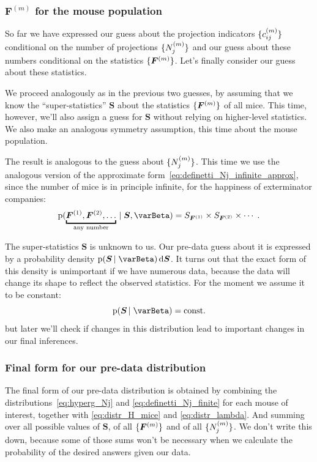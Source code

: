 \documentclass[\ifafour a4paper,12pt,\else a5paper,10pt,\fi%
onecolumn,oneside,article,%
british%
]{memoir}
\theoremstyle{remark}
\theoremstyle{innote}
\newcommand*{\di}{\mathrm{d}}%
\newcommand*{\pf}{\mathrm{p}}%
\renewcommand*{\|}[1][]{\nonscript\,#1\vert\nonscript\;\mathopen{}}
\newcommand*{\yI}{\varBeta}
\newcommand*{\yF}{\bm{F}}
\newcommand*{\yFm}[1][m]{\yF^{(#1)}}
\newcommand*{\yNm}[1][m]{N^{(#1)}}
\newcommand*{\ycm}[1][m]{c^{(#1)}}
\newcommand*{\ySS}{S}
\newcommand*{\yS}{\bm{\ySS}}
\DeclarePairedDelimiter\tu{\{}{\}}
\begin{document}
\subsubsection{$\yFm$ for the mouse population}
\label{sec:allmice_exch}

So far we have expressed our guess about the projection indicators
$\tu{\ycm_{ij}}$ conditional on the number of projections $\tu{\yNm_{j}}$
and our guess about these numbers conditional on the statistics
$\tu{\yFm}$. Let's finally consider our guess about these statistics.

We proceed analogously as in the previous two guesses, by assuming that
we know the \enquote{super-statistics} $\yS$ about the statistics
$\tu{\yFm}$ of all mice. This time, however, we'll also assign a guess for
$\yS$ without relying on higher-level statistics. We also make an analogous
symmetry assumption, this time about the mouse population.

The result is analogous to the guess about $\tu{\yNm_{j}}$. This time we
use the analogous version of the approximate
form~\eqref{eq:definetti_Nj_infinite_approx}, since the number of mice is
in principle infinite, for the happiness of exterminator companies:
\begin{equation}
  \label{eq:distr_H_mice}
  \pf( \underbracket{\yFm[1], \yFm[2], \dotsc}_{\text{any number}} \| \yS, \yI) =
  \ySS_{\yFm[1]} \times \ySS_{\yFm[2]} \times \dotsm\;.
\end{equation}

The super-statistics $\yS$ is unknown to us. Our pre-data guess about it is
expressed by a probability density $\pf(\yS \| \yI)\,\di\yS$. It turns out
that the exact form of this density is unimportant if we have numerous
data, because the data will change its shape to reflect the observed
statistics. For the moment we assume it to be constant:
\begin{equation}
  \label{eq:distr_lambda}
  \pf(\yS \| \yI) = \text{const.}
\end{equation}
but later we'll check if changes in this distribution lead to important
changes in our final inferences.

\subsubsection{Final form for our pre-data distribution}
\label{sec:final_predata}

The final form of our pre-data distribution is obtained by combining the
distributions~\eqref{eq:hyperg_Nj} and \eqref{eq:definetti_Nj_finite} for
each mouse of interest, together with \eqref{eq:distr_H_mice} and
\eqref{eq:distr_lambda}. And summing over all possible values of $\yS$, of
all $\tu{\yFm}$ and of all $\tu{\yNm_{j}}$. We don't write this down,
because some of those sums won't be necessary when we calculate the
probability of the desired answers given our data.
\end{document}
